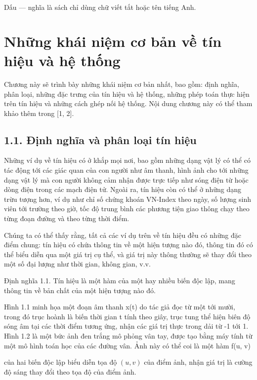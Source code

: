 \documentclass[
  10
]{article}
\begin{document}
Dấu --- nghĩa là sách chỉ dùng chữ viết tắt hoặc tên tiếng Anh.

\section{Những khái niệm cơ bản về tín hiệu và hệ
thống}\label{nhux1eefng-khuxe1i-niux1ec7m-cux1a1-bux1ea3n-vux1ec1-tuxedn-hiux1ec7u-vuxe0-hux1ec7-thux1ed1ng}

Chương này sẽ trình bày những khái niệm cơ bản nhất, bao gồm: định
nghĩa, phân loại, những đặc trưng của tín hiệu và hệ thống, những phép
toán thực hiện trên tín hiệu và những cách ghép nối hệ thống. Nội dung
chương này có thể tham khảo thêm trong {[}1, 2{]}.

\subsection{1.1. Định nghĩa và phân loại tín
hiệu}\label{ux111ux1ecbnh-nghux129a-vuxe0-phuxe2n-loux1ea1i-tuxedn-hiux1ec7u}

Những ví dụ về tín hiệu có ở khắp mọi nơi, bao gồm những dạng vật lý có
thể có tác động tới các giác quan của con người như âm thanh, hình ảnh
cho tới những dạng vật lý mà con người không cảm nhận được trực tiếp như
sóng điện từ hoặc dòng điện trong các mạch điện tử. Ngoài ra, tín hiệu
còn có thể ở những dạng trừu tượng hơn, ví dụ như chỉ số chứng khoán
VN-Index theo ngày, số lượng sinh viên tới trường theo giờ, tốc độ trung
bình các phương tiện giao thông chạy theo từng đoạn đường và theo từng
thời điểm.

Chúng ta có thể thấy rằng, tất cả các ví dụ trên về tín hiệu đều có
những đặc điểm chung: tín hiệu có chứa thông tin về một hiện tượng nào
đó, thông tin đó có thể biểu diễn qua một giá trị cụ thể, và giá trị này
thông thường sẽ thay đổi theo một số đại lượng như thời gian, không
gian, v.v.

Định nghĩa 1.1. Tín hiệu là một hàm của một hay nhiều biến độc lập, mang
thông tin về bản chất của một hiện tượng nào đó.

Hình 1.1 minh họa một đoạn âm thanh x(t) do tác giả đọc từ một tới mười,
trong đó trục hoành là biến thời gian t tính theo giây, trục tung thể
hiện biên độ sóng âm tại các thời điểm tương ứng, nhận các giá trị thực
trong dải từ -1 tới 1. Hình 1.2 là một bức ảnh đen trắng mô phỏng vân
tay, được tạo bằng máy tính từ một mô hình toán học của các đường vân.
Ảnh này có thể coi là một hàm f(u, v)

của hai biến độc lập biểu diễn tọa độ \(( u , v )\) của điểm ảnh, nhận
giá trị là cường độ sáng thay đổi theo tọa độ của điểm ảnh.
\end{document}
